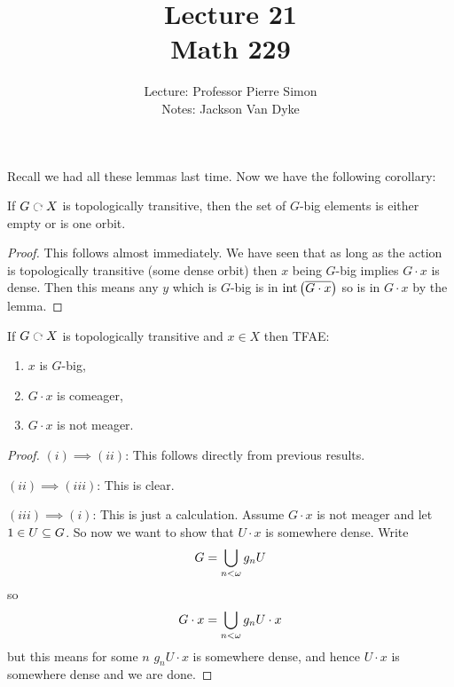 \documentclass{amsart}
\begin{document}
\title{Lecture 21\\ Math 229}
\author{Lecture: Professor Pierre Simon\\ Notes: Jackson Van Dyke}
\maketitle

Recall we had all these lemmas last time. Now we have the following corollary:
\begin{cor}
If $G\acts X$ is topologically transitive, then the set of $G$-big
elements is either empty or is one orbit.
\end{cor}

\begin{proof}
This follows almost immediately. We have seen that as long as the action is topologically
transitive (some dense orbit) then $x$ being $G$-big implies $G\cdot x$ is dense. 
Then this means any $y$ which is $G$-big is in $\operatorname{int}\left(\overline{G\cdot x}\right)$ so is in
$G\cdot x$ by the lemma.
\end{proof}

\begin{cor}
If $G\acts X$ is topologically transitive and $x\in X$ then TFAE:
\begin{enumerate}[label = (\iii)]
\item $x$ is $G$-big,
\item $G\cdot x$ is comeager, 
\item $G\cdot x$ is not meager.
\end{enumerate}
\end{cor}

\begin{proof}
$\left(i\right)\implies \left(ii\right)$: This follows directly from previous results.

$\left(ii\right)\implies\left(iii\right)$: This is clear. 

$\left(iii\right)\implies\left(i\right)$: This is just a calculation.
Assume $G\cdot x$ is not meager and let $1\in U\subseteq G$. So now we want to show that
$U\cdot x$ is somewhere dense. Write
\begin{equation}
G = \bigcup_{n < \omega} g_n U
\end{equation}
so
\begin{equation}
G\cdot x = \bigcup_{n < \omega} g_n U\cdot x
\end{equation}
but this means for some $n$
$g_n  U\cdot x$ is somewhere dense, and hence $U \cdot x$ is somewhere dense and we are
done.
\end{proof}
\end{document}
